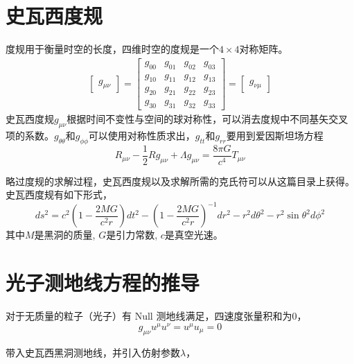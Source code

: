 \section{史瓦西度规}
度规用于衡量时空的长度，四维时空的度规是一个$4\times4$对称矩阵。
\begin{equation}
    \begin{split}
        \begin{bmatrix}g_{\mu\nu}\end{bmatrix}=\begin{bmatrix}g_{00} & g_{01} & g_{02} & g_{03} \\
            g_{10} & g_{11} & g_{12} & g_{13} \\
            g_{20} & g_{21} & g_{22} & g_{23} \\
            g_{30} & g_{31} & g_{32} & g_{33}
        \end{bmatrix}=\begin{bmatrix}g_{\nu\mu}\end{bmatrix}
    \end{split}
\end{equation}
史瓦西度规$g_{\mu\nu}$根据时间不变性与空间的球对称性，可以消去度规中不同基矢交叉项的系数。$g_{\theta\theta}$和$g_{\phi\phi}$可以使用对称性质求出，$g_{tt}$和$g_{rr}$要用到爱因斯坦场方程
\begin{equation}
    R_{\mu\nu}-\frac{1}{2}Rg_{\mu\nu}+\Lambda g_{\mu\nu}=\frac{8\pi G}{c^{4}}T_{\mu\nu}
\end{equation}

略过度规的求解过程，史瓦西度规以及求解所需的克氏符可以从这篇目录\cite{mueller_catalogue_2010}上获得。
史瓦西度规有如下形式，
\begin{equation}
    ds^{2}=c^{2}\left(1-\frac{2MG}{c^{2}r}\right)dt^{2}-\left(1-\frac{2MG}{c^{2}r}\right)^{-1}dr^{2}-r^{2}d\theta^{2}-r^{2}\sin\theta^{2}d\phi^{2}
\end{equation}
其中$M$是黑洞的质量, $G$是引力常数, $c$是真空光速。

\section{光子测地线方程的推导}

对于无质量的粒子（光子）有 Null 测地线满足，四速度张量积和为0，
\begin{equation}
    g_{\mu\nu}u^{\mu}u^{\nu}=u^{\mu}u_{\mu}=0
\end{equation}

带入史瓦西黑洞测地线，并引入仿射参数$\lambda$，

